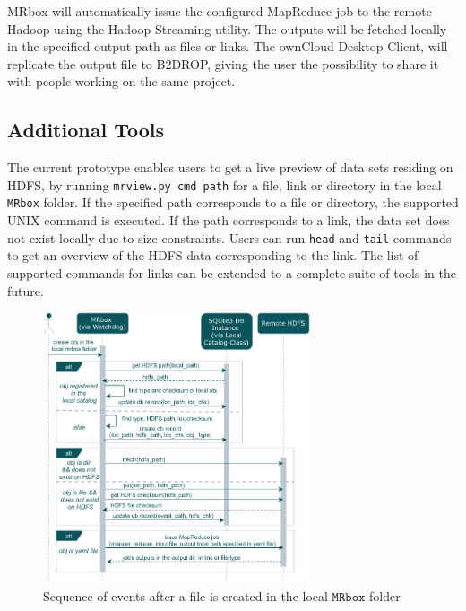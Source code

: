 MRbox will automatically issue the configured MapReduce job to the remote Hadoop using the Hadoop Streaming utility. The outputs will be fetched locally in the specified output path as files or links. The ownCloud Desktop Client, will replicate the output file to B2DROP, giving the user the possibility to share it with people working on the same project.

\subsection{Additional Tools}
The current prototype enables users to get a live preview of data sets residing on HDFS, by running \texttt{mrview.py cmd path} for a file, link or directory in the local \texttt{MRbox} folder. If the specified path corresponds to a file or directory, the supported UNIX command is executed. If the path corresponds to a link, the data set does not exist locally due to size constraints. Users can run \texttt{head} and \texttt{tail} commands to get an overview of the HDFS data corresponding to the link. The list of supported commands for links can be extended to a complete suite of tools in the future.

\begin{figure}
  \centering
  \includegraphics[width=\linewidth, height=8cm]{fig2.pdf}
  \caption{Sequence of events after a file is created in the local $\texttt{MRbox}$ folder}
\end{figure}

